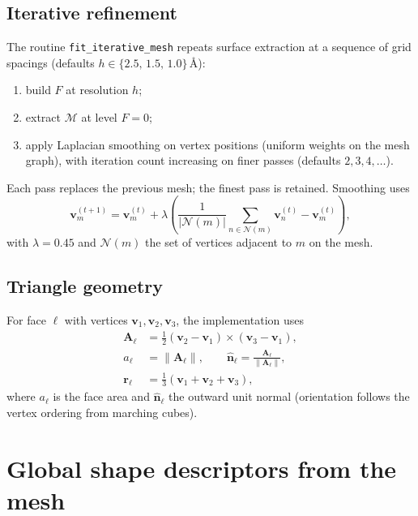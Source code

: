 \documentclass[11pt,a4paper]{article}
\begin{document}
\subsection{Iterative refinement}

The routine \texttt{fit\_iterative\_mesh} repeats surface extraction at a sequence
of grid spacings (defaults $h\in\{2.5,\,1.5,\,1.0\}$\,\AA):
\begin{enumerate}
  \item build $F$ at resolution $h$;
  \item extract $\mathcal{M}$ at level $F=0$;
  \item apply Laplacian smoothing on vertex positions (uniform weights on the mesh
        graph), with iteration count increasing on finer passes (defaults
        $2,3,4,\ldots$).
\end{enumerate}
Each pass replaces the previous mesh; the finest pass is retained. Smoothing uses
\begin{equation}
  \mathbf{v}_m^{(t+1)}
  = \mathbf{v}_m^{(t)}
  + \lambda \left(
      \frac{1}{|\mathcal{N}(m)|}\sum_{n\in\mathcal{N}(m)} \mathbf{v}_n^{(t)}
      - \mathbf{v}_m^{(t)}
    \right),
  \label{eq:laplacian}
\end{equation}
with $\lambda=0.45$ and $\mathcal{N}(m)$ the set of vertices adjacent to $m$ on the
mesh.

\subsection{Triangle geometry}

For face $\ell$ with vertices $\mathbf{v}_1,\mathbf{v}_2,\mathbf{v}_3$, the
implementation uses
\begin{align}
  \mathbf{A}_\ell &= \tfrac{1}{2}(\mathbf{v}_2-\mathbf{v}_1)\times(\mathbf{v}_3-\mathbf{v}_1),\\
  a_\ell &= \|\mathbf{A}_\ell\|, \qquad
  \hat{\mathbf{n}}_\ell = \frac{\mathbf{A}_\ell}{\|\mathbf{A}_\ell\|},\\
  \mathbf{r}_\ell &= \tfrac{1}{3}(\mathbf{v}_1+\mathbf{v}_2+\mathbf{v}_3),
\end{align}
where $a_\ell$ is the face area and $\hat{\mathbf{n}}_\ell$ the outward unit normal
(orientation follows the vertex ordering from marching cubes).

\section{Global shape descriptors from the mesh}
\end{document}
